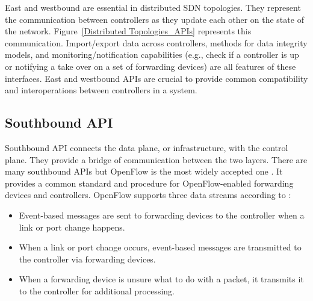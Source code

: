 \documentclass[conference]{IEEEtran}
\begin{document}
East and westbound are essential in distributed SDN topologies. They represent the communication between controllers as they update each other on the state of the network. Figure~\ref{Distributed Topologies_APIs} represents this communication. Import/export data across controllers, methods for data integrity models, and monitoring/notification capabilities (e.g., check if a controller is up or notifying a take over on a set of forwarding devices) are all features of these interfaces\cite{alsaeedi2019toward}. East and westbound APIs are crucial to provide common compatibility and interoperations between controllers in a system. 



\subsection{Southbound API}
Southbound API connects the data plane, or infrastructure, with the control plane. They provide a bridge of communication between the two layers. There are many southbound APIs but OpenFlow is the most widely accepted one \cite{chica2020security}. It provides a common standard and procedure for OpenFlow-enabled forwarding devices and controllers. OpenFlow supports three data streams according to \cite{kreutz2014software}:
\begin{itemize}
    \item Event-based messages are sent to forwarding devices to the controller when a link or port change happens.
    \item When a link or port change occurs, event-based messages are transmitted to the controller via forwarding devices.
    \item When a forwarding device is unsure what to do with a packet, it transmits it to the controller for additional processing. 
\end{itemize}
\end{document}
